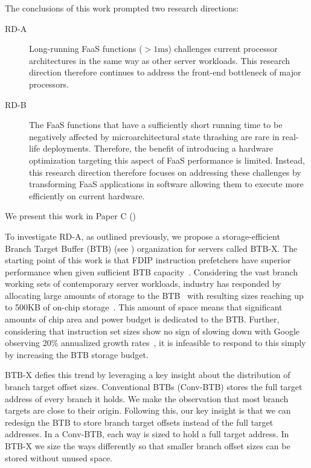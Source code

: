 \documentclass[../main.tex]{subfiles}
\begin{document}
\begin{refsection}
The conclusions of this work prompted two research directions:
 \begin{description}
 \item[RD-A] Long-running FaaS functions ($>1\text{ms}$) challenges
   current processor architectures in the same way as other server workloads. This research direction therefore
   continues to address the front-end bottleneck of major processors.
 \item[RD-B] The FaaS functions that have a sufficiently short running
   time to be negatively affected by microarchitectural state
   thrashing are rare in real-life deployments. Therefore, the benefit
   of introducing a hardware optimization targeting this aspect of
   FaaS performance is limited. Instead, this research direction
   therefore focuses on addressing these challenges by transforming
   FaaS applications in software allowing them to execute more efficiently on current hardware.
 \end{description}

We present this work in Paper C ()


To investigate RD-A, as outlined previously, we propose a
storage-efficient Branch Target Buffer (BTB) (see
) organization for servers called BTB-X.
The starting point of this work is that FDIP instruction prefetchers
have superior performance when given sufficient BTB
capacity~\cite{ishii21_re_fetch_direc_instr_prefet}. Considering the
vast branch working sets of contemporary server workloads, industry
has responded by allocating large amounts of storage to the
BTB~\cite{neoverse,IBMz,zen2} with resulting sizes reaching up to
500KB of on-chip storage~\cite{exynos}. This amount of space means
that significant amounts of chip area and power budget is dedicated to
the BTB. Further, considering that instruction set sizes show no sign
of slowing down with Google observing 20\% annualized growth
rates~\cite{kanev15_profil}, it is infeasible to respond to this
simply by increasing the BTB storage budget.

BTB-X defies this trend by leveraging a key insight about the
distribution of branch target offset sizes. Conventional BTBs
(Conv-BTB) stores the full target address of every branch it holds. We
make the observation that most branch targets are close to their
origin. Following this, our key insight is that we can redesign the
BTB to store branch target offsets instead of the full target
addresses. In a Conv-BTB, each way is sized to hold a full target
address. In BTB-X we size the ways differently so that smaller branch
offset sizes can be stored without unused space.


\end{refsection}
\end{document}
